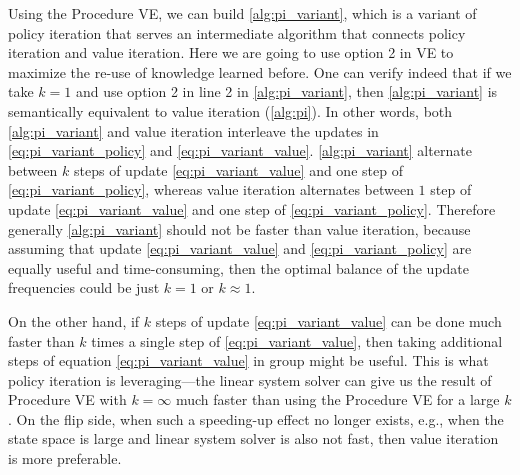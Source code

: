 Using the Procedure VE, we can build \cref{alg:pi_variant}, which is a variant of
policy iteration that serves an intermediate algorithm that connects policy
iteration and value iteration. Here we are going to use option 2 in VE to
maximize the re-use of knowledge learned before. One can verify indeed that
if we take $k = 1$ and use option 2 in line 2 in \cref{alg:pi_variant}, then \cref{alg:pi_variant}
is semantically equivalent to value iteration (\cref{alg:pi}). In other words,
both \cref{alg:pi_variant} and value iteration interleave the updates in \cref{eq:pi_variant_policy} and \cref{eq:pi_variant_value}.
\cref{alg:pi_variant} alternate between $k$ steps of update \cref{eq:pi_variant_value} and one step of \cref{eq:pi_variant_policy},
whereas value iteration alternates between $1$ step of update \cref{eq:pi_variant_value} and one %
step of \cref{eq:pi_variant_policy}. Therefore generally \cref{alg:pi_variant} should not be faster than value
iteration, because assuming that update \cref{eq:pi_variant_value} and \cref{eq:pi_variant_policy} are equally useful and
time-consuming, then the optimal balance of the update frequencies could
be just $k = 1$ or $k \approx 1$.

On the other hand, if $k$ steps of update \cref{eq:pi_variant_value} can be done much faster than
$k$ times a single step of \cref{eq:pi_variant_value}, then taking additional steps of equation \cref{eq:pi_variant_value}
in group might be useful. This is what policy iteration is leveraging---the
linear system solver can give us the result of Procedure VE with $k = \infty$ much
faster than using the Procedure VE for a large $k$. On the flip side, when such
a speeding-up effect no longer exists, e.g., when the state space is large and %
linear system solver is also not fast, then value iteration is more preferable.


